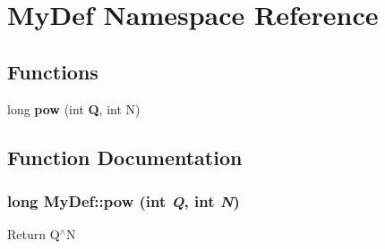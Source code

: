 \section{MyDef Namespace Reference}
\label{namespaceMyDef}


\subsection*{Functions}
\begin{CompactItemize}
\item 
long {\bf pow} (int {\bf Q}, int N)
\end{CompactItemize}


\subsection{Function Documentation}
\subsubsection{\setlength{\rightskip}{0pt plus 5cm}long MyDef::pow (int {\em Q}, int {\em N})}\label{namespaceMyDef_2176654433a1a7b32bbdb05cca7e2dec}


Return Q$^\wedge$N 